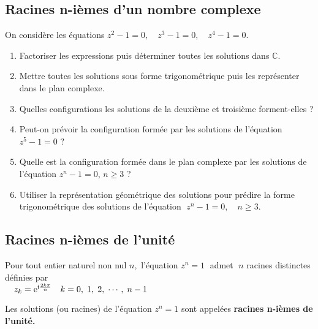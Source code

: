 \subsection{ Racines n-ièmes d'un nombre complexe}
\begin{lemma}
On considère les équations \; $ z^2-1=0,\quad  z^3-1=0 ,\quad  z^4-1=0 $.
\begin{enumerate}
\item Factoriser les expressions puis déterminer toutes les solutions dans $ \mathbb{C} $.
\item Mettre  toutes les solutions sous forme trigonométrique  puis les représenter dans le plan complexe.
\item Quelles configurations les solutions de la deuxième et troisième forment-elles ?
\item Peut-on prévoir la configuration formée par les solutions de l'équation   \; $ z^5-1=0 $ ?
\item Quelle est la  configuration formée dans le plan complexe par les solutions de l'équation   \; $ z^n-1=0 $, \quad $ n\geq 3 $ ?
\item  Utiliser la représentation géométrique des solutions  pour prédire la forme trigonométrique des solutions de l'équation    $ \;z^n-1=0 , \quad  n\geq 3 $.
\end{enumerate}
\end{lemma}

\subsection*{Racines n-ièmes de l'unité}
\begin{theorem}
Pour tout entier naturel  non nul $ n ,$ l'équation  $ z^n=1 \;$ admet  $\;  n $ racines   distinctes  définies par
\\$\quad  z_k=\mathrm{e}^{\text{i}\frac{2k\pi}{n} }\quad k=0, \; 1, \; 2 ,\; \cdots, \;n-1$

\medskip

Les solutions (ou racines) de l'équation $ z^n=1 $ sont appelées  \textbf{racines n-ièmes de l'unité.}

\end{theorem}

